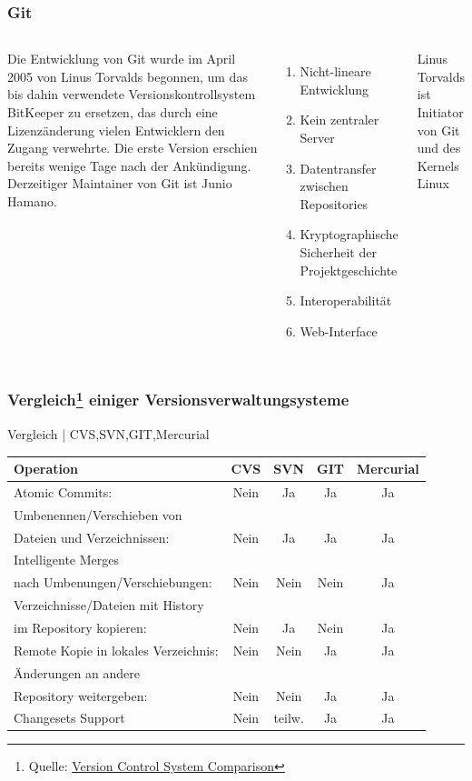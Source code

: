 \documentclass{beamer}
\begin{document}
\begin{frame}\frametitle{Git}
\begin{columns}
        {\small Die Entwicklung von Git wurde im April 2005 von Linus Torvalds begonnen, um das bis dahin verwendete Versionskontrollsystem BitKeeper zu ersetzen, das durch eine Lizenzänderung vielen Entwicklern den Zugang verwehrte. Die erste Version erschien bereits wenige Tage nach der Ankündigung. Derzeitiger Maintainer von Git ist Junio Hamano.}
                \begin{enumerate}
                \item Nicht-lineare Entwicklung
                \item Kein zentraler Server
                \item Datentransfer zwischen Repositories
                \item Kryptographische Sicherheit der Projektgeschichte
                \item Interoperabilität
				\item Web-Interface
                \end{enumerate}
                
{\tiny Linus Torvalds ist Initiator von Git und des Kernels Linux}
\end{columns}
\end{frame}

\begin{frame}\frametitle{Vergleich\footnote{Quelle: \href{http://better-scm.shlomifish.org/comparison/comparison.html}{Version Control System Comparison}} einiger Versionsverwaltungsysteme }
\begin{exampleblock}{Vergleich | CVS,SVN,GIT,Mercurial}
	\begin{tabular}{l|c c c c}
	\hline
		\textbf{Operation} & \textbf{CVS} & \textbf{SVN} & \textbf{GIT} & \textbf{Mercurial} \\
	\hline
	\hline
		Atomic Commits: & Nein & Ja & Ja & Ja \\
	\hline
		Umbenennen/Verschieben von\\
		Dateien und Verzeichnissen: & Nein & Ja & Ja & Ja \\
	\hline
		Intelligente Merges \\ 
		nach Umbenungen/Verschiebungen: & Nein & Nein & Nein & Ja \\
	\hline
		Verzeichnisse/Dateien mit History \\
		im Repository kopieren: & Nein & Ja & Nein & Ja \\
	\hline		
		Remote Kopie in lokales Verzeichnis: & Nein & Nein & Ja & Ja \\
	\hline		
		Änderungen an andere \\
		Repository weitergeben: & Nein & Nein & Ja & Ja \\		
	\hline		
		Changesets Support & Nein & teilw. & Ja & Ja \\ 		
	\hline
	\hline
\end{tabular} 
\end{exampleblock}
\end{frame}
\end{document}
